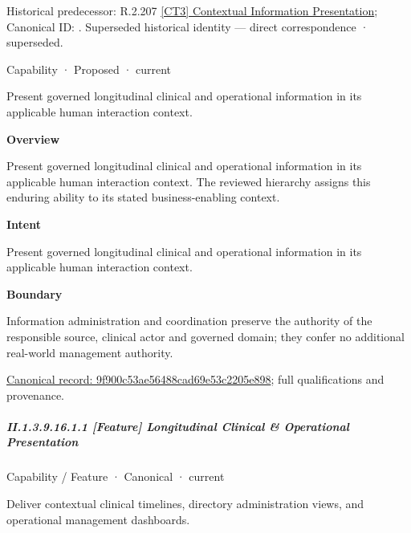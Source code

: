 {\small Historical predecessor: R.2.207 \hyperref[element:e349d5f6a8774bbe8d150f9c51af770c]{[CT3] Contextual Information Presentation}; Canonical ID: \texttt{}. Superseded historical identity — direct correspondence · superseded.}\par
\label{element:9f900c53ae56488cad69e53c2205e898}
{\small Capability · Proposed · current}\par

Present governed longitudinal clinical and operational information in its applicable human interaction context.



\textbf{Overview}



Present governed longitudinal clinical and operational information in its applicable human interaction context. The reviewed hierarchy assigns this enduring ability to its stated business-enabling context.



\textbf{Intent}



Present governed longitudinal clinical and operational information in its applicable human interaction context.



\textbf{Boundary}



Information administration and coordination preserve the authority of the responsible source, clinical actor and governed domain; they confer no additional real-world management authority.


{\footnotesize \href{../../../../../../../continuum/strategy/capability/9f900c53ae56488cad69e53c2205e898.md}{Canonical record: 9f900c53ae56488cad69e53c2205e898}; full qualifications and provenance.}\par
\subparagraph*{II.1.3.9.16.1.1 [Feature] Longitudinal Clinical \& Operational Presentation}
\label{navigation:II.1.3.9.16.1.1}

\label{element:e82eaafa2e4046f48d4c86e15f282a0b}
{\small Capability / Feature · Canonical · current}\par

Deliver contextual clinical timelines, directory administration views, and operational management dashboards.



